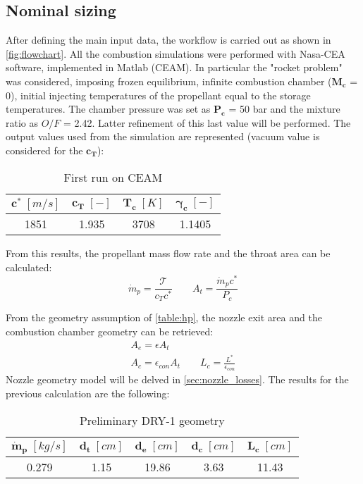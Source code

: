 \subsection{Nominal sizing}
\label{subsec:nominal}
After defining the main input data, the workflow is carried out as shown in \autoref{fig:flowchart}. All the combustion simulations were performed with Nasa-CEA software, implemented in Matlab (CEAM). In particular the "rocket problem" was considered, imposing frozen equilibrium, infinite combustion chamber ($\boldsymbol{M_c}$ = 0), initial injecting temperatures of the propellant equal to the storage temperatures. The chamber pressure was set as $\boldsymbol{P_c}$ = 50 bar and the mixture ratio as $O/F$ = 2.42. Latter refinement of this last value will be performed. The output values used from the simulation are represented (vacuum value is considered for the $\boldsymbol{c_T}$):
\begin{table}[H]
    \renewcommand{\arraystretch}{1.2}
    \centering
    \begin{tabular}{|c|c|c|c|}
        \hline
        $\boldsymbol{c^*} \; [m/s]$ & $\boldsymbol{c_T} \; [-]$ & $\boldsymbol{T_c} \; [K]$ & $\boldsymbol{\gamma_c} \; [-]$ \\
        \hline
        \hline
        1851 & 1.935 & 3708 & 1.1405 \\
        \hline
    \end{tabular}
    \caption{First run on CEAM}
    \label{table:out_CEA_1}
\end{table}

From this results, the propellant mass flow rate and the throat area can be calculated:
\begin{equation}
    \dot{m}_p = \frac{\mathcal{T}}{c_T c^*} 
    \qquad 
    A_t = \frac{\dot{m}_p c^*}{P_c}
\end{equation}

From the geometry assumption of \autoref{table:hp}, the nozzle exit area and the combustion chamber geometry can be retrieved:
\begin{gather}
    A_e = \epsilon A_t
    \\
    A_c = \epsilon_{con} A_t \qquad L_c = \frac{L^*}{\epsilon_{con}}
\end{gather}
Nozzle geometry model will be delved in \autoref{sec:nozzle_losses}. The results for the previous calculation are the following:

\begin{table}[H]
    \renewcommand{\arraystretch}{1.2}
    \centering
    \begin{tabular}{|c|c|c|c|c|}
        \hline
        $\boldsymbol{\dot{m}_p} \; [kg/s]$ & $\boldsymbol{d_t} \; [cm]$ & $\boldsymbol{d_e} \; [cm]$  & $\boldsymbol{d_{c}} \; [cm]$ & $\boldsymbol{L_c} \; [cm]$ \\
        \hline
        \hline
        0.279 & 1.15 & 19.86 & 3.63 & 11.43 \\
        \hline
    \end{tabular}
    \caption{Preliminary DRY-1 geometry}
    \label{table:preliminary_dry}
\end{table}

